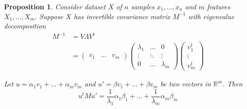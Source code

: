 \documentclass[11pt]{amsart}
\newtheorem{proposition}[theorem]{Proposition}
\theoremstyle{definition}
\begin{document}
\begin{proposition} \label{scaling_phenomenon} Consider dataset $X$ of $n$ samples $x_1, \dots , x_n$ and $m$ features $X_1, \dots, X_m$. Suppose $X$ has invertible covariance matrix $M^{-1}$
with eigenvalue decomposition
\begin{align*}
M^{-1} & = V \Lambda V^t \\
 & = \left( \begin{array}{ccc} v_1 & \dots & v_m \end{array} \right)
\left( \begin{array}{ccc} \lambda_1 & \dots & 0 \\ \vdots & \ddots & \vdots \\ 0 & \dots & \lambda_m \end{array} \right)
\left( \begin{array}{c} v_1^t \\ \vdots \\ v_m^t \end{array} \right)
\end{align*}

Let $u = \alpha_1 v_1 + \dots + \alpha_m v_m$ and $u' = \beta v_1 + \dots + \beta v_m$ be two vectors in $\mathbb{R}^m$. Then
$$u^t M u' = \frac{1}{\lambda_1} \alpha_1 \beta_1 + \dots + \frac{1}{\lambda_m} \alpha_m \beta_m$$
\end{proposition}
\end{document}
